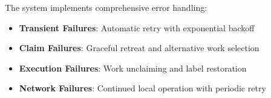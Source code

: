 \documentclass[11pt,a4paper]{article}
\begin{document}
The system implements comprehensive error handling:

\begin{itemize}
    \item \textbf{Transient Failures}: Automatic retry with exponential backoff
    \item \textbf{Claim Failures}: Graceful retreat and alternative work selection
    \item \textbf{Execution Failures}: Work unclaiming and label restoration
    \item \textbf{Network Failures}: Continued local operation with periodic retry
\end{itemize}
\end{document}
